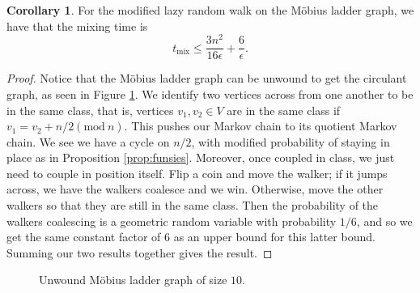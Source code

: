 \documentclass[10pt,a4paper]{amsart}
\theoremstyle{definition}
\numberwithin{definition}{section}
\newtheorem{corollary}[definition]{Corollary}
\newcommand{\Mod}[1]{(\mathrm{mod}\ #1)}
\begin{document}
\begin{corollary}\label{cor:one}
For the modified lazy random walk on the M\"{o}bius ladder graph, we have that the mixing time is 
\[ t_{\text{mix}} \leq \frac{3n^2}{16 \epsilon} + \frac{6}{\epsilon}. \]
\end{corollary}

\begin{proof}
Notice that the M\"{o}bius ladder graph can be unwound to get the circulant graph, as seen in Figure \ref{fig:graph10}. We identify two vertices across from one another to be in the same class, that is, vertices $v_1, v_2 \in V$ are in the same class if $v_1 = v_2 + n/2 \Mod{n}$. This pushes our Markov chain to its quotient Markov chain. We see we have a cycle on $n/2$, with modified probability of staying in place as in Proposition \ref{prop:funsies}. Moreover, once coupled in class, we just need to couple in position itself. Flip a coin and move the walker; if it jumps across, we have the walkers coalesce and we win. Otherwise, move the other walkers so that they are still in the same class. Then the probability of the walkers coalescing is a geometric random variable with probability $1/6$, and so we get the same constant factor of $6$ as an upper bound for this latter bound. Summing our two results together gives the result.
\end{proof}

\begin{figure}
    
\caption{Unwound M\"{o}bius ladder graph of size $10$.}
    \label{fig:graph10}
\end{figure}
\end{document}
